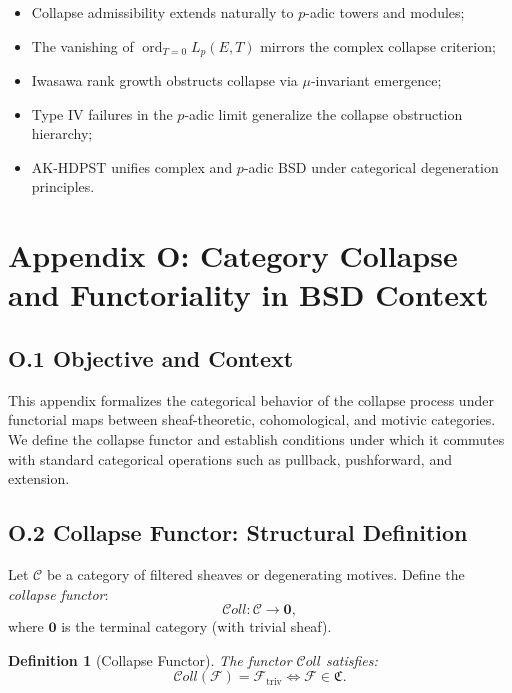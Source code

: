 \documentclass[11pt]{article}
\newtheorem{definition}[theorem]{Definition}
\newcommand{\Coll}{\mathcal{C}oll}
\newcommand{\ord}{\operatorname{ord}}
\begin{document}
\begin{itemize}
  \item Collapse admissibility extends naturally to \( p \)-adic towers and modules;
  \item The vanishing of \( \ord_{T=0} L_p(E, T) \) mirrors the complex collapse criterion;
  \item Iwasawa rank growth obstructs collapse via \(\mu\)-invariant emergence;
  \item Type IV failures in the \( p \)-adic limit generalize the collapse obstruction hierarchy;
  \item AK-HDPST unifies complex and \( p \)-adic BSD under categorical degeneration principles.
\end{itemize}



\appendix
\section*{Appendix O: Category Collapse and Functoriality in BSD Context}

\subsection*{O.1 Objective and Context}

This appendix formalizes the categorical behavior of the collapse process under functorial maps between sheaf-theoretic, cohomological, and motivic categories. We define the collapse functor and establish conditions under which it commutes with standard categorical operations such as pullback, pushforward, and extension.

\subsection*{O.2 Collapse Functor: Structural Definition}

Let \( \mathcal{C} \) be a category of filtered sheaves or degenerating motives. Define the \emph{collapse functor}:
\[
\Coll : \mathcal{C} \longrightarrow \mathbf{0},
\]
where \( \mathbf{0} \) is the terminal category (with trivial sheaf).

\begin{definition}[Collapse Functor]
The functor \( \Coll \) satisfies:
\[
\Coll(\mathcal{F}) = \mathcal{F}_{\mathrm{triv}} \iff 
\mathcal{F} \in \mathfrak{C}.
\]
\end{definition}
\end{document}
